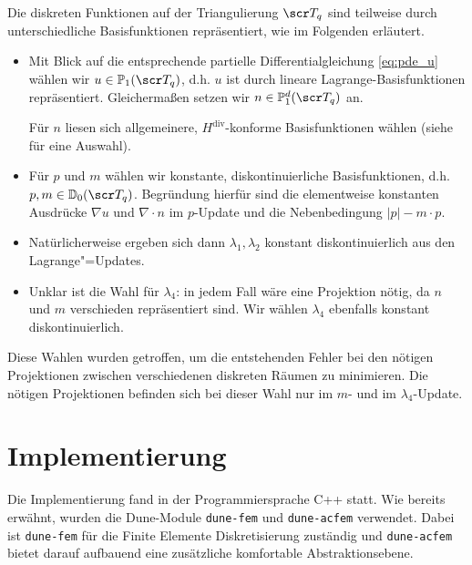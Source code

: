 \documentclass{mythesis}
\begin{document}
Die diskreten Funktionen auf der Triangulierung $\scr T_q$ sind teilweise durch unterschiedliche Basisfunktionen repräsentiert, wie im Folgenden erläutert.
\begin{itemize}
    \item
	Mit Blick auf die entsprechende partielle Differentialgleichung \eqref{eq:pde_u} wählen wir $u \in \P_1(\scr T_q)$, d.h. $u$ ist durch lineare Lagrange-Basisfunktionen repräsentiert.
	Gleichermaßen setzen wir $n \in \P_1^d(\scr T_q)$ an.

	Für $n$ liesen sich allgemeinere, $H^{\mathrm{div}}$-konforme Basisfunktionen wählen (siehe \cite[§3]{logg2012automated} für eine Auswahl).
    \item
	Für $p$ und $m$ wählen wir konstante, diskontinuierliche Basisfunktionen, d.h. $p, m \in \D_0(\scr T_q)$.
       	Begründung hierfür sind die elementweise konstanten Ausdrücke $\nabla u$ und $\nabla \cdot n$ im $p$-Update und die Nebenbedingung $|p| - m\cdot p$.
    \item
	Natürlicherweise ergeben sich dann $\lambda_1, \lambda_2$ konstant diskontinuierlich aus den Lagrange"=Updates.
    \item
	Unklar ist die Wahl für $\lambda_4$: in jedem Fall wäre eine Projektion nötig, da $n$ und $m$ verschieden repräsentiert sind.
	Wir wählen $\lambda_4$ ebenfalls konstant diskontinuierlich.
\end{itemize}
Diese Wahlen wurden getroffen, um die entstehenden Fehler bei den nötigen Projektionen zwischen verschiedenen diskreten Räumen zu minimieren.
Die nötigen Projektionen befinden sich bei dieser Wahl nur im $m$- und im $\lambda_4$-Update.








\section{Implementierung}


Die Implementierung fand in der Programmiersprache C++ statt.
Wie bereits erwähnt, wurden die Dune-Module \texttt{dune-fem} und \texttt{dune-acfem} verwendet.
Dabei ist \texttt{dune-fem} für die Finite Elemente Diskretisierung zuständig und \texttt{dune-acfem} bietet darauf aufbauend eine zusätzliche komfortable Abstraktionsebene.
\end{document}
